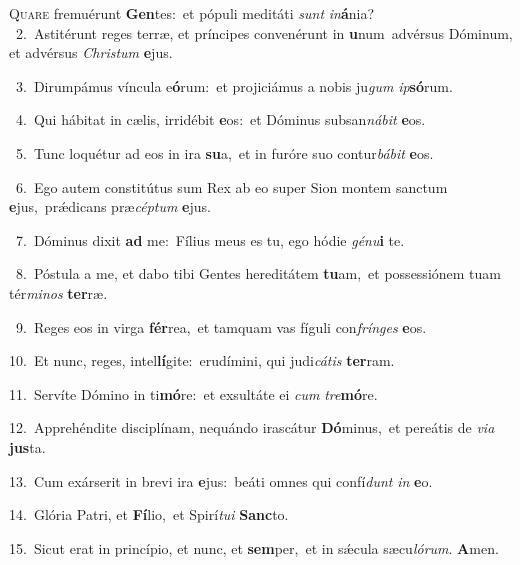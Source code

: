 \lettrine{\initial\textcolor{\initialcolor}{Q}}{uare} fremuérunt \textbf{Gen}\-tes:~\star et pópuli meditáti \textit{sunt} \textit{in}\-\textbf{á}nia?\\
{\numbfont\textcolor{\numbcolor}{~2.}}~Astitérunt reges terræ, et príncipes convenérunt in \textbf{u}\-num~\star advérsus Dóminum, et advérsus \textit{Chris}\-\textit{tum} \textbf{e}\-jus.\par
{\numbfont\textcolor{\numbcolor}{~3.}}~Dirumpámus víncula e\-\textbf{ó}\-rum:~\star et projiciámus a nobis ju\textit{gum} \textit{ip}\-\textbf{só}rum.\par
{\numbfont\textcolor{\numbcolor}{~4.}}~Qui hábitat in cælis, irridébit \textbf{e}\-os:~\star et Dóminus subsan\-\textit{ná}\-\textit{bit} \textbf{e}\-os.\par
{\numbfont\textcolor{\numbcolor}{~5.}}~Tunc loquétur ad eos in ira \textbf{su}\-a,~\star et in furóre suo contur\-\textit{bá}\-\textit{bit} \textbf{e}\-os.\par
{\numbfont\textcolor{\numbcolor}{~6.}}~Ego autem constitútus sum Rex ab eo super Sion montem sanctum \textbf{e}\-jus,~\star prǽdicans præ\-\textit{cép}\-\textit{tum} \textbf{e}\-jus.\par
{\numbfont\textcolor{\numbcolor}{~7.}}~Dóminus dixit \textbf{ad} me:~\star Fílius meus es tu, ego hódie \textit{gé}\-\textit{nu}\textbf{i} te.\par
{\numbfont\textcolor{\numbcolor}{~8.}}~Póstula a me, et dabo tibi Gentes hereditátem \textbf{tu}\-am,~\star et possessiónem tuam tér\-\textit{mi}\-\textit{nos} \textbf{ter}\-ræ.\par
{\numbfont\textcolor{\numbcolor}{~9.}}~Reges eos in virga \textbf{fér}\-rea,~\star et tamquam vas fíguli con\-\textit{frín}\-\textit{ges} \textbf{e}\-os.\par
{\numbfont\textcolor{\numbcolor}{10.}}~Et nunc, reges, intel\-\textbf{lí}\-gite:~\star erudímini, qui judi\-\textit{cá}\-\textit{tis} \textbf{ter}\-ram.\par
{\numbfont\textcolor{\numbcolor}{11.}}~Servíte Dómino in ti\-\textbf{mó}\-re:~\star et exsultáte ei \textit{cum} \textit{tre}\-\textbf{mó}re.\par
{\numbfont\textcolor{\numbcolor}{12.}}~Apprehéndite disciplínam, nequándo irascátur \textbf{Dó}\-minus,~\star et pereátis de \textit{vi}\-\textit{a} \textbf{jus}\-ta.\par
{\numbfont\textcolor{\numbcolor}{13.}}~Cum exárserit in brevi ira \textbf{e}\-jus:~\star beáti omnes qui confí\textit{dunt} \textit{in} \textbf{e}o.\par
{\numbfont\textcolor{\numbcolor}{14.}}~Glória Patri, et \textbf{Fí}\-lio,~\star et Spirí\-\textit{tu}\-\textit{i} \textbf{Sanc}\-to.\par
{\numbfont\textcolor{\numbcolor}{15.}}~Sicut erat in princípio, et nunc, et \textbf{sem}\-per,~\star et in sǽcula sæcu\-\textit{ló}\-\textit{rum}. \textbf{A}\-men.\par
